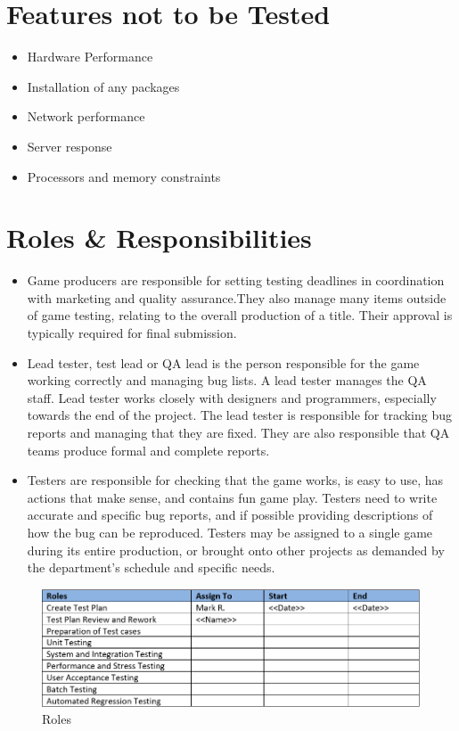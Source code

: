 \documentclass{article}
\begin{document}
\newpage

\section{Features not to be Tested}
\begin{itemize}
    \item Hardware Performance
    \item Installation of any packages
    \item Network performance 
    \item Server response
    \item Processors and memory constraints
\end{itemize}
\newpage

\section{Roles & Responsibilities}
\begin{itemize}
    \item Game producers are responsible for setting testing deadlines in coordination with marketing and quality assurance.They also manage many items outside of game testing, relating to the overall production of a title. Their approval is typically required for final submission.
    \item Lead tester, test lead or QA lead is the person responsible for the game working correctly and managing bug lists. A lead tester manages the QA staff. Lead tester works closely with designers and programmers, especially towards the end of the project. The lead tester is responsible for tracking bug reports and managing that they are fixed. They are also responsible that QA teams produce formal and complete reports.
    \item Testers are responsible for checking that the game works, is easy to use, has actions that make sense, and contains fun game play. Testers need to write accurate and specific bug reports, and if possible providing descriptions of how the bug can be reproduced. Testers may be assigned to a single game during its entire production, or brought onto other projects as demanded by the department's schedule and specific needs.
\end{itemize}
\begin{figure}[h]
    \centering
    \includegraphics[scale=0.9]{./images/Roles.PNG}
    \caption{Roles}
    \label{fig:my_label}
\end{figure}
\end{document}
